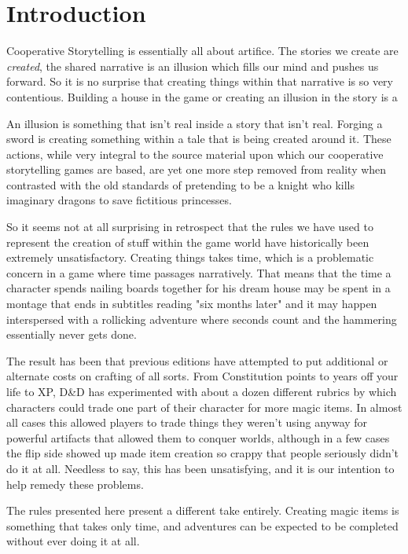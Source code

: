 \section{Introduction}

Cooperative Storytelling is essentially all about artifice. The stories we create are \textit{created}, the shared narrative is an illusion which fills our mind and pushes us forward. So it is no surprise that creating things within that narrative is so very contentious. Building a house in the game or creating an illusion in the story is a

An illusion is something that isn't real inside a story that isn't real. Forging a sword is creating something within a tale that is being created around it. These actions, while very integral to the source material upon which our cooperative storytelling games are based, are yet one more step removed from reality when contrasted with the old standards of pretending to be a knight who kills imaginary dragons to save fictitious princesses.

So it seems not at all surprising in retrospect that the rules we have used to represent the creation of stuff within the game world have historically been extremely unsatisfactory. Creating things takes time, which is a problematic concern in a game where time passages narratively. That means that the time a character spends nailing boards together for his dream house may be spent in a montage that ends in subtitles reading "six months later" and it may happen interspersed with a rollicking adventure where seconds count and the hammering essentially never gets done.

The result has been that previous editions have attempted to put additional or alternate costs on crafting of all sorts. From Constitution points to years off your life to XP, D\&D has experimented with about a dozen different rubrics by which characters could trade one part of their character for more magic items. In almost all cases this allowed players to trade things they weren't using anyway for powerful artifacts that allowed them to conquer worlds, although in a few cases the flip side showed up made item creation so crappy that people seriously didn't do it at all. Needless to say, this has been unsatisfying, and it is our intention to help remedy these problems.

The rules presented here present a different take entirely. Creating magic items is something that takes only time, and adventures can be expected to be completed without ever doing it at all.

